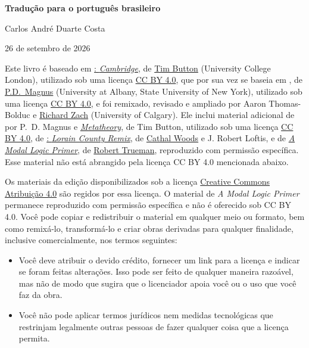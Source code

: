 \noindent\small%
\fi
\ifHTMLtarget
\par\bigskip\noindent
\textbf{Tradução para o português brasileiro}\par
Carlos André Duarte Costa\par
26 de setembro de 2026\par
\bigskip
\fi
Este livro é baseado em
\href{https://www.homepages.ucl.ac.uk/~uctytbu/OERs.html}{\forallx:
\textit{Cambridge}}, de
\href{https://www.homepages.ucl.ac.uk/~uctytbu/}{Tim Button} (University College London),
utilizado sob uma licença \href{https://creativecommons.org/licenses/by/4.0/}{CC BY
4.0}, que por sua vez se baseia
em \href{https://www.fecundity.com/logic/}{\forallx}, de
\href{https://www.fecundity.com/job/}{P.D.\ Magnus}
(University at Albany, State University of New York),
utilizado sob uma licença \href{https://creativecommons.org/licenses/by/4.0/}{CC BY
4.0},
e foi remixado, revisado e ampliado por Aaron
Thomas-Bolduc e \href{https://richardzach.org/}{Richard Zach}
(University of Calgary).
Ele inclui material adicional de \forallx{} por P.~D. Magnus e
\href{https://www.homepages.ucl.ac.uk/~uctytbu/OERs.html}{\textit{Metatheory}}, de Tim Button,
utilizado sob uma licença \href{https://creativecommons.org/licenses/by/4.0/}{CC BY
4.0},
de \href{https://github.com/rob-helpy-chalk/openintroduction}{\forallx: \textit{Lorain
County Remix}},
de \href{https://sites.google.com/site/cathalwoods/}{Cathal Woods} e
J. Robert Loftis, e de \href{http://www.rtrueman.com/uploads/7/0/3/2/70324387/modal_logic_primer.pdf}{\textit{A Modal Logic Primer}}, de \href{http://www.rtrueman.com/}{Robert Trueman}, reproduzido com permissão específica.
Esse material não está abrangido pela licença CC BY 4.0 mencionada abaixo.


\ifHTMLtarget\else
  \bigskip

  \noindent\footnotesize
\fi
Os materiais da edição disponibilizados sob a licença \href{https://creativecommons.org/licenses/by/4.0/}{Creative Commons Atribuição 4.0} são regidos por essa licença. O material de \textit{A Modal Logic Primer} permanece reproduzido com permissão específica e não é oferecido sob CC BY 4.0.
Você pode copiar e redistribuir o material em qualquer meio ou formato, bem como remixá-lo, transformá-lo e criar obras derivadas para qualquer finalidade, inclusive comercialmente, nos termos seguintes:
\begin{itemize}
\item Você deve atribuir o devido crédito, fornecer um link para a licença e indicar se foram feitas alterações. Isso pode ser feito de qualquer maneira razoável, mas não de modo que sugira que o licenciador apoia você ou o uso que você faz da obra.
\item Você não pode aplicar termos jurídicos nem medidas tecnológicas que restrinjam legalmente outras pessoas de fazer qualquer coisa que a licença permita.
\end{itemize}

